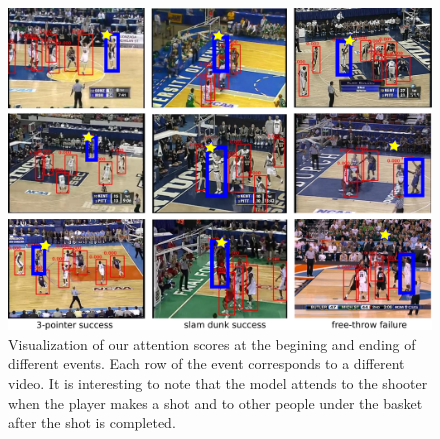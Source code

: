 \begin{figure}[t!]
\begin{center}
   \includegraphics[width=1.0\linewidth]{images/visual_examples_v2.pdf}
\end{center}
   \caption{Visualization of our attention scores at the begining and ending of different events.
Each row of the event corresponds to a different video. It is interesting to note that the model
attends to the shooter when the player makes a shot and to other people under the basket after
the shot is completed.}
\label{fig:visual_attention}
\end{figure}



